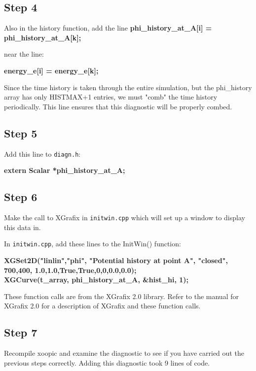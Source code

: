 \subsection{Step 4}
Also in the history function, add the line
{\bf  phi\_history\_at\_A[i] = phi\_history\_at\_A[k]; }

near the line:

{\bf  energy\_e[i] = energy\_e[k];}

  Since the time history is taken through the entire simulation, but the phi\_history
array has only HISTMAX+1 entries, we must "comb" the time history periodically.
This line ensures that this diagnostic will be properly combed.


\subsection{Step 5}

Add this line to {\tt diagn.h}:

{\bf  extern Scalar *phi\_history\_at\_A;}

\subsection{Step 6}
 Make the call to XGrafix in {\tt initwin.cpp} which will set up a window
to display this data in.

In {\tt initwin.cpp}, add these lines to the InitWin() function:

{\bf  XGSet2D("linlin","phi", "Potential history at point A", "closed", 700,400,
	1.0,1.0,True,True,0,0,0.0,0.0);\\
  XGCurve(t\_array, phi\_history\_at\_A, \&hist\_hi, 1); }

These function calls are from the XGrafix 2.0 library.  Refer to the manual for
XGrafix 2.0 for a description of XGrafix and these function calls.

\subsection{Step 7}

  Recompile xoopic and examine the diagnostic to see if you have carried
out the previous steps correctly.  Adding this diagnostic took 9 lines of code.




